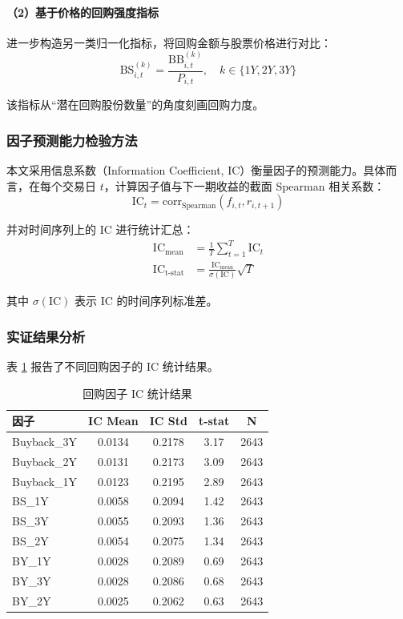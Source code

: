 \documentclass[a4paper,10pt]{article}
\begin{document}
\paragraph{（2）基于价格的回购强度指标}

进一步构造另一类归一化指标，将回购金额与股票价格进行对比：
\begin{equation}
\text{BS}^{(k)}_{i,t} = \frac{\text{BB}^{(k)}_{i,t}}{P_{i,t}}, \quad k \in \{1Y, 2Y, 3Y\}
\end{equation}

该指标从“潜在回购股份数量”的角度刻画回购力度。

\subsubsection{因子预测能力检验方法}

本文采用信息系数（Information Coefficient, IC）衡量因子的预测能力。具体而言，在每个交易日 $t$，计算因子值与下一期收益的截面 Spearman 相关系数：
\begin{equation}
\text{IC}_t = \text{corr}_{\text{Spearman}} \left( f_{i,t}, r_{i,t+1} \right)
\end{equation}

并对时间序列上的 IC 进行统计汇总：
\begin{align}
\text{IC}_{\text{mean}} &= \frac{1}{T} \sum_{t=1}^{T} \text{IC}_t \\
\text{IC}_{\text{t-stat}} &= \frac{\text{IC}_{\text{mean}}}{\sigma(\text{IC})} \sqrt{T}
\end{align}

其中 $\sigma(\text{IC})$ 表示 IC 的时间序列标准差。

\subsubsection{实证结果分析}

表 \ref{tab:bb_ic} 报告了不同回购因子的 IC 统计结果。

\begin{table}[H]
\centering
\caption{回购因子 IC 统计结果}
\label{tab:bb_ic}
\begin{tabular}{lcccc}
\toprule
因子 & IC Mean & IC Std & t-stat & N \\
\midrule
Buyback\_3Y & 0.0134 & 0.2178 & 3.17 & 2643 \\
Buyback\_2Y & 0.0131 & 0.2173 & 3.09 & 2643 \\
Buyback\_1Y & 0.0123 & 0.2195 & 2.89 & 2643 \\
BS\_1Y      & 0.0058 & 0.2094 & 1.42 & 2643 \\
BS\_3Y      & 0.0055 & 0.2093 & 1.36 & 2643 \\
BS\_2Y      & 0.0054 & 0.2075 & 1.34 & 2643 \\
BY\_1Y      & 0.0028 & 0.2089 & 0.69 & 2643 \\
BY\_3Y      & 0.0028 & 0.2086 & 0.68 & 2643 \\
BY\_2Y      & 0.0025 & 0.2062 & 0.63 & 2643 \\
\bottomrule
\end{tabular}
\end{table}
\end{document}
